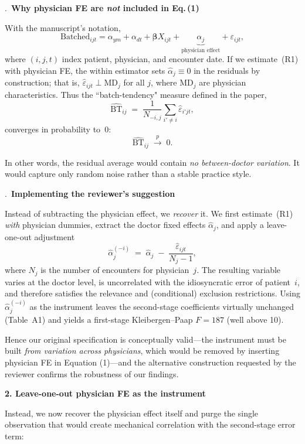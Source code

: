 \documentclass[11pt]{article}
\newcommand{\1}{\hbox{\rm 1\kern-.35em 1}}
\begin{document}
{{{{\bigskip
{}.\ \textbf{Why physician FE are \emph{not} included in Eq.\,(1)}

With the manuscript’s notation,
\begin{equation}
\text{Batched}_{ijt}= 
      \alpha_{ym}+\alpha_{dt}+ \boldsymbol\beta X_{ijt}
      + \underbrace{\alpha_j}_{\text{physician effect}}
      +\varepsilon_{ijt},
      \tag{R1}
\end{equation}
where $(i,j,t)$ index patient, physician, and encounter date.  If we estimate~(R1) with physician FE, the within estimator sets $\widehat\alpha_j\equiv 0$ in the residuals by construction; that is, $\widehat\varepsilon_{ijt}\perp \text{MD}_j$ for all $j$, where $\text{MD}_j$ are physician characteristics.  Thus the ``batch-tendency" measure defined in the paper,
\[
\widehat{\text{BT}}_{ij}\;=\;
   \frac{1}{N_{-i,j}}\sum_{i'\neq i}\widehat\varepsilon_{i'jt},
\]
converges in probability to~$0$:
\[
\widehat{\text{BT}}_{ij}\;\xrightarrow{p}\;0 .
\]

In other words, the residual average would contain \emph{no between-doctor variation}. It would capture only random noise rather than a stable practice style.

\bigskip
{}.\ \textbf{Implementing the reviewer’s suggestion}

Instead of subtracting the physician effect, we \emph{recover} it.  We first estimate~(R1) \emph{with} physician dummies, extract the doctor fixed effects $\widehat\alpha_j$, and apply a leave-one-out adjustment
\[
\widehat\alpha_{j}^{(-i)} \;=\;
      \widehat\alpha_j \;-\; \frac{\widehat\varepsilon_{ijt}}{N_j-1},
\]
where $N_j$ is the number of encounters for physician~$j$. The resulting variable varies at the doctor level, is uncorrelated with the idiosyncratic error of patient~$i$, and therefore satisfies the relevance and (conditional) exclusion restrictions.  Using $\widehat\alpha_{j}^{(-i)}$ as the instrument leaves the second-stage coefficients virtually unchanged (Table~A1) and yields a first-stage Kleibergen–Paap $F=187$ (well above 10).

Hence our original specification is conceptually valid—the instrument must be built \emph{from variation across physicians}, which would be removed by inserting physician FE in Equation (1)—and the alternative construction requested by the reviewer confirms the robustness of our findings.


\bigskip
\noindent\textbf{2.  Leave-one-out physician FE as the instrument}

Instead, we now recover the physician effect itself and purge the single observation that would create mechanical correlation with the second-stage error term:

}}}}
\end{document}

